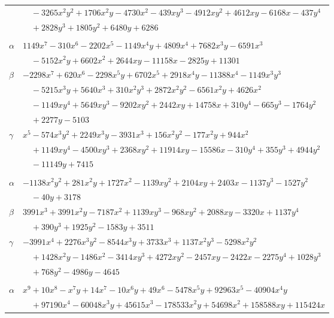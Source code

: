 \documentclass[11pt]{article}
\begin{document}
\begin{longtable}{@{}ll@{}}
 & $\quad -3265x^{2}y^{2}+1706x^{2}y-4730x^{2}-439xy^{3}-4912xy^{2}+4612xy-6168x-437y^{4}$\\
 & $\quad +2828y^{3}+1805y^{2}+6480y+6286$\\
\addlinespace[3pt]
\multicolumn{2}{@{}l}{$\{i,j\}=\{23,116\}$, $k_{ij}=2^{7}\cdot 3^{2}\cdot 5^{2}$}\\
$\alpha$ & $1149x^{7}-310x^{6}-2202x^{5}-1149x^{4}y+4809x^{4}+7682x^{3}y-6591x^{3}$\\
 & $\quad -5152x^{2}y+6602x^{2}+2644xy-11158x-2825y+11301$\\
$\beta$ & $-2298x^{7}+620x^{6}-2298x^{5}y+6702x^{5}+2918x^{4}y-11388x^{4}-1149x^{3}y^{3}$\\
 & $\quad -5215x^{3}y+5640x^{3}+310x^{2}y^{3}+2872x^{2}y^{2}-6561x^{2}y+4626x^{2}$\\
 & $\quad -1149xy^{4}+5649xy^{3}-9202xy^{2}+2442xy+14758x+310y^{4}-665y^{3}-1764y^{2}$\\
 & $\quad +2277y-5103$\\
$\gamma$ & $x^{5}-574x^{3}y^{2}+2249x^{3}y-3931x^{3}+156x^{2}y^{2}-177x^{2}y+944x^{2}$\\
 & $\quad +1149xy^{4}-4500xy^{3}+2368xy^{2}+11914xy-15586x-310y^{4}+355y^{3}+4944y^{2}$\\
 & $\quad -11149y+7415$\\
\addlinespace[3pt]
\multicolumn{2}{@{}l}{$\{i,j\}=\{23,124\}$, $k_{ij}=2^{4}\cdot 3\cdot 5^{2}\cdot 7$}\\
$\alpha$ & $-1138x^{2}y^{2}+281x^{2}y+1727x^{2}-1139xy^{2}+2104xy+2403x-1137y^{3}-1527y^{2}$\\
 & $\quad -40y+3178$\\
$\beta$ & $3991x^{3}+3991x^{2}y-7187x^{2}+1139xy^{3}-968xy^{2}+2088xy-3320x+1137y^{4}$\\
 & $\quad +390y^{3}+1925y^{2}-1583y+3511$\\
$\gamma$ & $-3991x^{4}+2276x^{3}y^{2}-8544x^{3}y+3733x^{3}+1137x^{2}y^{3}-5298x^{2}y^{2}$\\
 & $\quad +1428x^{2}y-1486x^{2}-3414xy^{3}+4272xy^{2}-2457xy-2422x-2275y^{4}+1028y^{3}$\\
 & $\quad +768y^{2}-4986y-4645$\\
\addlinespace[3pt]
\multicolumn{2}{@{}l}{$\{i,j\}=\{23,156\}$, $k_{ij}=2^{6}\cdot 3^{2}\cdot 5^{3}\cdot 7$}\\
$\alpha$ & $x^{9}+10x^{8}-x^{7}y+14x^{7}-10x^{6}y+49x^{6}-5478x^{5}y+92963x^{5}-40904x^{4}y$\\
 & $\quad +97190x^{4}-60048x^{3}y+45615x^{3}-178533x^{2}y+54698x^{2}+158588xy+115424x$\\

\end{longtable}
\end{document}
